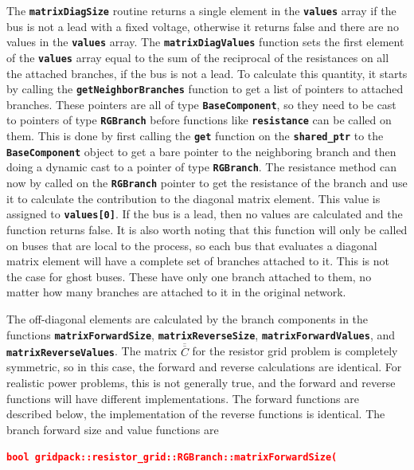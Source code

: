 \documentclass[12pt]{report} %
\begin{document}
The \texttt{\textbf{matrixDiagSize}} routine returns a single element in the \texttt{\textbf{values}} array if the bus is not a lead with a fixed voltage, otherwise it returns false and there are no values in the \texttt{\textbf{values}} array. The \texttt{\textbf{matrixDiagValues}} function sets the first element of the \texttt{\textbf{values}} array equal to the sum of the reciprocal of the resistances on all the attached branches, if the bus is not a lead. To calculate this quantity, it starts by calling the \texttt{\textbf{getNeighborBranches}} function to get a list of pointers to attached branches. These pointers are all of type \texttt{\textbf{BaseComponent}}, so they need to be cast to pointers of type \texttt{\textbf{RGBranch}} before functions like \texttt{\textbf{resistance}} can be called on them. This is done by first calling the \texttt{\textbf{get}} function on the \texttt{\textbf{shared\_ptr}} to the \texttt{\textbf{BaseComponent}} object to get a bare pointer to the neighboring branch and then doing a dynamic cast to a pointer of type \texttt{\textbf{RGBranch}}. The resistance method can now by called on the \texttt{\textbf{RGBranch}} pointer to get the resistance of the branch and use it to calculate the contribution to the diagonal matrix element. This value is assigned to \texttt{\textbf{values[0]}}. If the bus is a lead, then no values are calculated and the function returns false. It is also worth noting that this function will only be called on buses that are local to the process, so each bus that evaluates a diagonal matrix element will have a complete set of branches attached to it. This is not the case for ghost buses. These have only one branch attached to them, no matter how many branches are attached to it in the original network.

The off-diagonal elements are calculated by the branch components in the functions \texttt{\textbf{matrixForwardSize}}, \texttt{\textbf{matrixReverseSize}}, \texttt{\textbf{matrixForwardValues}}, and \texttt{\textbf{matrixReverseValues}}. The matrix $\overline{\overline{C}}$ for the resistor grid problem is completely symmetric, so in this case, the forward and reverse calculations are identical. For realistic power problems, this is not generally true, and the forward and reverse functions will have different implementations. The forward functions are described below, the implementation of the reverse functions is identical. The branch forward size and value functions are

\textcolor{red}{\texttt{\textbf{bool gridpack::resistor\_grid::RGBranch::matrixForwardSize(}}}
\end{document}
